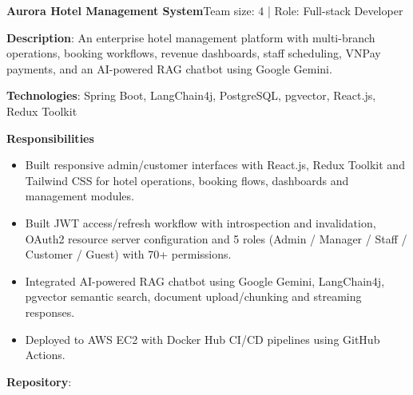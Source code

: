   \resumeProjectHeading
    {\textbf{Aurora Hotel Management System}}{Team size: 4 | Role: Full-stack Developer}
    \resumeItemListStart
      \item \textbf{Description}: An enterprise hotel management platform with multi-branch operations, booking workflows,
        revenue dashboards, staff scheduling, VNPay payments, and an AI-powered RAG chatbot using Google Gemini.
      \item \textbf{Technologies}: Spring Boot, LangChain4j, PostgreSQL, pgvector, React.js, Redux Toolkit
      \item \textbf{Responsibilities}
        \begin{itemize}
          \item Built responsive admin/customer interfaces with React.js, Redux Toolkit and Tailwind CSS for hotel operations, booking flows, dashboards and management modules.
          \item Built JWT access/refresh workflow with introspection and invalidation, OAuth2 resource server configuration and 5 roles (Admin / Manager / Staff / Customer / Guest) with 70+ permissions.
          \item Integrated AI-powered RAG chatbot using Google Gemini, LangChain4j, pgvector semantic search, document upload/chunking and streaming responses.
          \item Deployed to AWS EC2 with Docker Hub CI/CD pipelines using GitHub Actions.
        \end{itemize}
      \item \textbf{Repository}: \href{https://github.com/nvminh162/aurora-hotel-management-system}{}
    \resumeItemListEnd

